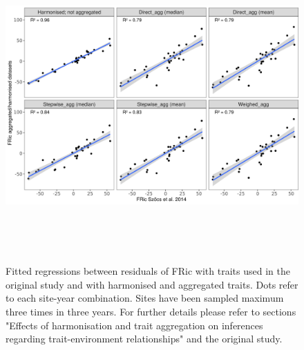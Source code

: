 \documentclass[12pt]{article}
\begin{document}
\begin{figure}[ht]
    \centering
    \includegraphics[width=17cm, height=12cm]{Correlation_fd_metrics_FRic.png}
    \caption{Fitted regressions between residuals of FRic with traits used in the original study and with harmonised and aggregated traits. Dots refer to each site-year combination. Sites have been sampled maximum three times in three years. For further details please refer to sections "Effects of harmonisation and trait aggregation on inferences regarding trait-environment relationships" and the original study.}
    \label{fig:FRic}
\end{figure}
\end{document}
